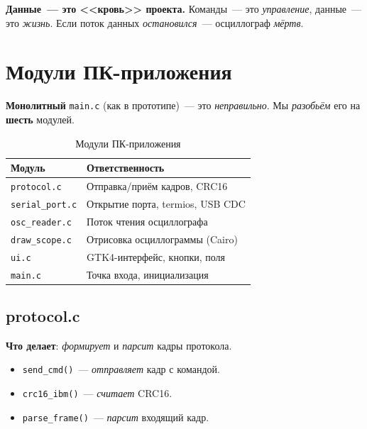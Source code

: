 \begin{keybox}
\textbf{Данные~--- это <<кровь>> проекта.} Команды~--- это
\emph{управление}, данные~--- это \emph{жизнь}. Если поток
данных \emph{остановился}~--- осциллограф \emph{мёртв}.
\end{keybox}

\section{Модули ПК-приложения}
\label{sec:arch-pc-modules}

\textbf{Монолитный} \texttt{main.c} (как в прототипе)~---
это \emph{неправильно}. Мы \emph{разобьём} его на \textbf{шесть}
модулей.

\begin{table}[htbp]
\centering
\caption{Модули ПК-приложения}
\label{tab:arch-pc-modules}
\small
\begin{tabularx}{\textwidth}{@{}l L@{}}
\toprule
\textbf{Модуль} & \textbf{Ответственность} \\
\midrule
\texttt{protocol.c}    & Отправка/приём кадров, CRC16 \\
\texttt{serial\_port.c} & Открытие порта, termios, USB CDC \\
\texttt{osc\_reader.c}  & Поток чтения осциллографа \\
\texttt{draw\_scope.c}  & Отрисовка осциллограммы (Cairo) \\
\texttt{ui.c}           & GTK4-интерфейс, кнопки, поля \\
\texttt{main.c}         & Точка входа, инициализация \\
\bottomrule
\end{tabularx}
\end{table}

\subsection{protocol.c}

\textbf{Что делает}: \emph{формирует} и \emph{парсит}
кадры протокола.

\begin{itemize}
    \item \texttt{send\_cmd()}~--- \emph{отправляет}
          кадр с командой.
    \item \texttt{crc16\_ibm()}~--- \emph{считает} CRC16.
    \item \texttt{parse\_frame()}~--- \emph{парсит}
          входящий кадр.
\end{itemize}

